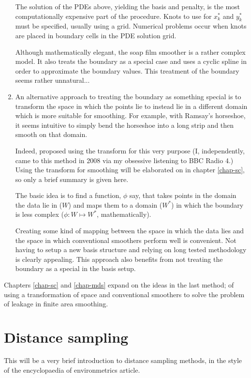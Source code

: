 \begin{enumerate}
The solution of the PDEs above, yielding the basis and penalty, is the most computationally expensive part of the procedure. Knots to use for $x_k^*$ and $y_k^*$ must be specified, usually using a grid. Numerical problems occur when knots are placed in boundary cells in the PDE solution grid.

Although mathematically elegant, the soap film smoother is a rather complex model. It also treats the boundary as a special case and uses a cyclic spline in order to approximate the boundary values. This treatment of the boundary seems rather unnatural...

\item An alternative approach to treating the boundary as something special is to transform the space in which the points lie to instead lie in a different domain which is more suitable for smoothing. For example, with Ramsay's horseshoe, it seems intuitive to simply bend the horseshoe into a long strip and then smooth on that domain.

Indeed, \cite{eilerstalk} proposed using the \sch transform for this very purpose (I, independently, came to this method in 2008 via my obsessive listening to BBC Radio 4.) Using the \sch transform for smoothing will be elaborated on in chapter \ref{chap-sc}, so only a brief summary is given here.

The basic idea is to find a function, $\phi$ say, that takes points in the domain the data lie in ($W$) and maps them to a domain ($W^*$) in which the boundary is less complex ($\phi : W \mapsto W^*$, mathematically).

Creating some kind of mapping between the space in which the data lies and the space in which conventional smoothers perform well is convenient. Not having to setup a new basis structure and relying on long tested methodology is clearly appealing. This approach also benefits from not treating the boundary as a special in the basis setup.
\end{enumerate}

Chapters \ref{chap-sc} and \ref{chap-mds} expand on the ideas in the last method; of using a transformation of space and conventional smoothers to solve the problem of leakage in finite area smoothing.

\section{Distance sampling}

This will be a very brief introduction to distance sampling methods, in the style of the encyclopaedia of environmetrics article.
